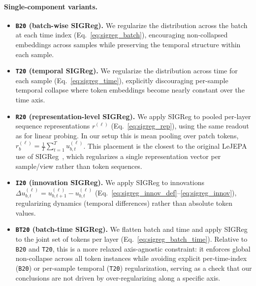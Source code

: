 \paragraph{Single-component variants.}
\begin{itemize}
  \item \textbf{\texttt{B20} (batch-wise SIGReg).} We regularize the distribution across the batch at each time index (Eq.~\eqref{eq:sigreg_batch}), encouraging non-collapsed embeddings across samples while preserving the temporal structure within each sample.
  \item \textbf{\texttt{T20} (temporal SIGReg).} We regularize the distribution across time for each sample (Eq.~\eqref{eq:sigreg_time}), explicitly discouraging per-sample temporal collapse where token embeddings become nearly constant over the time axis.
  \item \textbf{\texttt{R20} (representation-level SIGReg).} We apply SIGReg to pooled per-layer sequence representations $r^{(\ell)}$ (Eq.~\eqref{eq:sigreg_rep}), using the same readout as for linear probing. In our setup this is mean pooling over patch tokens, $r^{(\ell)}_b=\frac{1}{T}\sum_{t=1}^{T}u^{(\ell)}_{b,t}$. This placement is the closest to the original LeJEPA use of SIGReg~\citep{balestriero2025lejepa}, which regularizes a single representation vector per sample/view rather than token sequences.
  \item \textbf{\texttt{I20} (innovation SIGReg).} We apply SIGReg to innovations $\Delta u^{(\ell)}_{b,t}=u^{(\ell)}_{b,t+1}-u^{(\ell)}_{b,t}$ (Eq.~\eqref{eq:sigreg_innov_def}--\eqref{eq:sigreg_innov}), regularizing dynamics (temporal differences) rather than absolute token values.
  \item \textbf{\texttt{BT20} (batch-time SIGReg).} We flatten batch and time and apply SIGReg to the joint set of tokens per layer (Eq.~\eqref{eq:sigreg_batch_time}). Relative to \texttt{B20} and \texttt{T20}, this is a more relaxed axis-agnostic constraint: it enforces global non-collapse across all token instances while avoiding explicit per-time-index (\texttt{B20}) or per-sample temporal (\texttt{T20}) regularization, serving as a check that our conclusions are not driven by over-regularizing along a specific axis.
\end{itemize}


